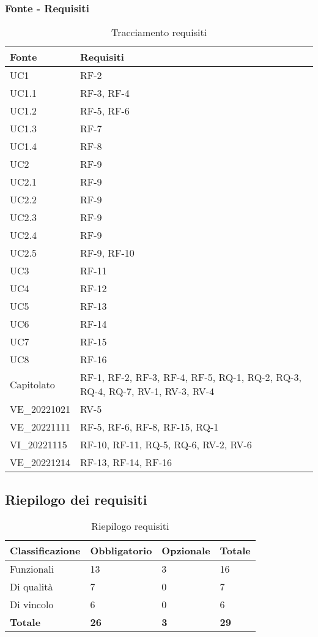 \subsubsection{Fonte - Requisiti}
\begin{table}[H]
	\centering
	\begin{tabular}{| p{} | p{} |} 
 \hline
 \textbf{Fonte} & \textbf{Requisiti} \\
	\hline
	UC1 & RF-2\\
	\hline
	UC1.1 & RF-3, RF-4\\
	\hline
	UC1.2 & RF-5, RF-6\\
	\hline
	UC1.3 & RF-7\\
	\hline
	UC1.4 & RF-8\\
	\hline
	UC2 & RF-9\\
	\hline
	UC2.1 & RF-9\\
	\hline
	UC2.2 & RF-9\\
	\hline
	UC2.3 & RF-9\\
	\hline
	UC2.4 & RF-9\\
	\hline
	UC2.5 & RF-9, RF-10\\
	\hline
	UC3 & RF-11\\ 
	\hline
	UC4 & RF-12\\
	\hline
	UC5 & RF-13\\
	\hline
	UC6 & RF-14\\
	\hline
	UC7 & RF-15\\
	\hline
	UC8 & RF-16\\
	\hline
	Capitolato & RF-1, RF-2, RF-3, RF-4, RF-5, RQ-1, RQ-2, RQ-3, RQ-4, RQ-7, RV-1, RV-3, RV-4\\
	\hline
	VE\_20221021 & RV-5\\
	\hline
	VE\_20221111 & RF-5, RF-6, RF-8, RF-15, RQ-1\\
	\hline
	VI\_20221115 & RF-10, RF-11, RQ-5, RQ-6, RV-2, RV-6\\
	\hline
	VE\_20221214 & RF-13, RF-14, RF-16\\
	\hline
	\end{tabular}
	\caption{Tracciamento requisiti}
\end{table}

\subsection{Riepilogo dei requisiti}

\begin{table}[h]
	\centering
	\begin{tabular}{| p{} | p{} | p{} | p{} |} 
		\hline
		\textbf{Classificazione} & \textbf{Obbligatorio} & \textbf{Opzionale} & \textbf{Totale} \\
		\hline
		Funzionali & 13 & 3 & 16\\
		\hline
		Di qualità & 7 & 0 & 7\\
		\hline
		Di vincolo & 6 & 0 & 6\\
		\hline
		\textbf{Totale} & \textbf{26} &\textbf {3} &  \textbf{29}\\
		\hline
	\end{tabular}
	\caption{Riepilogo requisiti}
\end{table}
